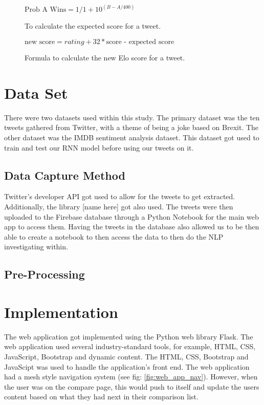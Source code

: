 	
	\begin{figure}[h]
		\centering
		 $\text{Prob A Wins} = 1/1+10^{(B-A/400)}$
		\caption{To calculate the expected score for a tweet.}
		\label{fig:elo_maths_1}
	\end{figure}

\begin{figure}[h]
	\centering

	$\text{new score} = rating + 32 *  \text{score - expected score}$
	\caption{Formula to calculate the new Elo score for a tweet.}
	\label{fig:elo_maths_2}
\end{figure}
	
	\section{Data Set}
	There were two datasets used within this study. The primary dataset was the ten tweets gathered from Twitter, with a theme of being a joke based on Brexit. The other dataset was the IMDB sentiment analysis dataset. This dataset got used to train and test our RNN model before using our tweets on it. 
	
	\subsection{Data Capture Method}
	Twitter's developer API got used to allow for the tweets to get extracted. Additionally, the library [name here] got also used. The tweets were then uploaded to the Firebase database through a Python Notebook for the main web app to access them. Having the tweets in the database also allowed us to be then able to create a notebook to then access the data to then do the NLP investigating within.
	
	\subsection{Pre-Processing}
	
	
	
	
	\section{Implementation}
	
	The web application got implemented using the Python web library Flask. The web application used several industry-standard tools, for example, HTML, CSS, JavaScript, Bootstrap and dynamic content. The HTML, CSS, Bootstrap and JavaScipt was used to handle the application's front end. The web application had a mesh style navigation system (see fig: \ref{fig:web_app_nav}). However, when the user was on the compare page, this would push to itself and update the users content based on what they had next in their comparison list.
	
